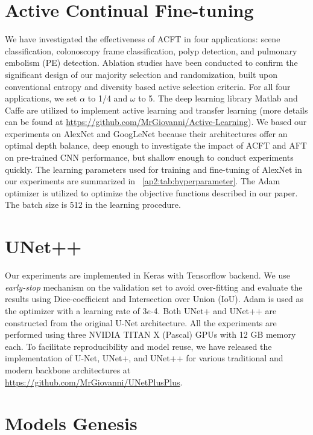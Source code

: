 \section*{Active Continual Fine-tuning}
We have investigated the effectiveness of ACFT in four applications: scene classification, colonoscopy frame classification, polyp detection, and pulmonary embolism (PE) detection. Ablation studies have been conducted to confirm the significant design of our majority selection and randomization, built upon conventional entropy and diversity based active selection criteria.
For all four applications, we set $\alpha$ to 1/4 and $\omega$ to 5.
The deep learning library Matlab and Caffe are utilized to implement active learning and transfer learning (more details can be found at \href{https://github.com/MrGiovanni/Active-Learning}{https://github.com/MrGiovanni/Active-Learning}). We based our experiments on AlexNet and GoogLeNet because their architectures offer an optimal depth balance, deep enough to investigate the impact of ACFT and AFT on pre-trained CNN performance, but shallow enough to conduct experiments quickly. The learning parameters used for training and fine-tuning of AlexNet in our experiments are summarized in \tableautorefname~\ref{ap2:tab:hyperparameter}. The Adam optimizer is utilized to optimize the objective functions described in our paper. The batch size is 512 in the learning procedure.

\section*{UNet++}

Our experiments are implemented in Keras with Tensorflow backend. We use {\em early-stop} mechanism on the validation set to avoid over-fitting and evaluate the results using Dice-coefficient and Intersection over Union (IoU). Adam is used as the optimizer with a learning rate of 3$e$-4. Both UNet+ and UNet++ are constructed from the original U-Net architecture. All the experiments are performed using three NVIDIA TITAN X (Pascal) GPUs with 12 GB memory each. To facilitate reproducibility and model reuse, we have released the implementation of U-Net, UNet+, and UNet++ for various traditional and modern backbone architectures at \href{https://github.com/MrGiovanni/UNetPlusPlus}{https://github.com/MrGiovanni/UNetPlusPlus}. 


\section*{Models Genesis}

